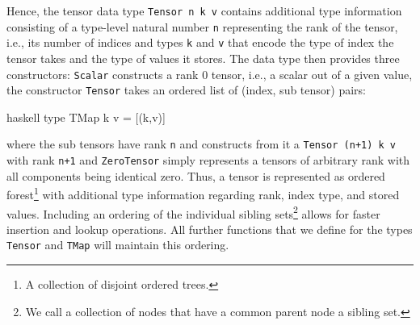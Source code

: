 Hence, the tensor data type \texttt{Tensor n k v} contains additional type information consisting of a type-level natural number \texttt{n} representing the rank of the tensor, i.e., its number of indices and types \texttt{k} and \texttt{v} that encode the type of index the tensor takes and the type of values it stores. The data type then provides three constructors: \texttt{Scalar} constructs a rank 0 tensor, i.e., a scalar out of a given value, the constructor \texttt{Tensor} takes an ordered list of (index, sub tensor) pairs:
\begin{center}
\begin{cminted}{haskell}
type TMap k v = [(k,v)]
\end{cminted}
\end{center}
where the sub tensors have rank \texttt{n} and constructs from it a \texttt{Tensor (n+1) k v} with rank \texttt{n+1} and \texttt{ZeroTensor} simply represents a tensors of arbitrary rank with all components being identical zero. Thus, a tensor is represented as ordered forest\footnote{A collection of disjoint ordered trees.} with additional type information regarding rank, index type, and stored values. Including an ordering of the individual sibling sets\footnote{We call a collection of nodes that have a common parent node a sibling set.} allows for faster insertion and lookup operations. All further functions that we define for the types \texttt{Tensor} and \texttt{TMap} will maintain this ordering.

